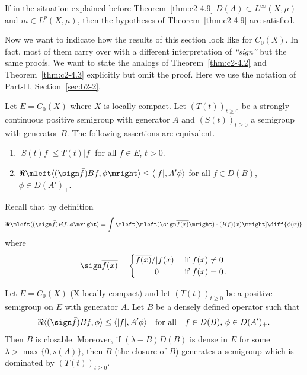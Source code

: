 \begin{example}\label{ex:c2-4.11}
If in the situation explained before Theorem~\ref{thm:c2-4.9}  
$D(A) \subset L^{\infty}(X,\mu)$ and $m \in L^{p}(X,\mu)$, then the hypotheses of Theorem~\ref{thm:c2-4.9}   are satisfied.
\end{example}
Now we want to indicate how the results of this section look like for $C_{0}(X)$.
In fact, most of them carry over with a different interpretation of \emph{``sign''} but the same proofs.
We want to state the analogs of Theorem~\ref{thm:c2-4.2}   and Theorem~\ref{thm:c2-4.3}   explicitly but omit the proof.
Here we use the notation of Part-II, Section~\ref{sec:b2-2}.
\begin{theorem}\label{thm:c2-4.12}
Let $E = C_{0}(X)$ where $X$ is locally compact.
Let $(T(t))_{t \geq 0}$ be a strongly continuous positive semigroup with
generator $A$ and $(S(t))_{t \geq 0}$ a semigroup with generator $B$.
The following assertions are equivalent.
\begin{enumerate}[\upshape (a)]
\item \label{thm:c2-4.12-1}
$|S(t)f| \leq T(t)|f|$ for all $f \in E$, $t > 0$.
\item \label{thm:c2-4.12-2}
$\Re\mleft\langle(\sign  \bar{f})Bf,\phi\mright\rangle \leq \langle|f|,A'\phi\rangle$ for all $f \in D(B)$, $\phi \in D(A')_{+}$.
\end{enumerate}
\end{theorem}
Recall that by definition
\[
\Re\mleft\langle(\sign  \bar{f})Bf,\phi\mright\rangle = \int \mleft[\mleft(\sign \overline{f(x)}\mright)\cdot(Bf)(x)\mright] \diff{\phi(x)}
\]
where 
\[\sign  \overline{f(x)} =
\begin{cases}
    \overline{f(x)}/|f(x)| & \text{if } f(x) \neq 0 \\
    \ \quad\quad0  & \text{if } f(x) = 0\,.
\end{cases}
\]
\begin{theorem}\label{thm:c2-4.13}
Let $E = C_{0}(X)$ (X locally compact) and let $(T(t))_{t \geq 0}$
be a positive semigroup on $E$ with generator $A$.
Let $B$ be a densely defined operator such that
\begin{equation}\label{eq:c2-4.12}
\Re  \langle(\sign  \bar{f})Bf,\phi\rangle \leq \langle|f|,A'\phi\rangle \quad 
\text{for all} \quad f \in D(B),\, \phi \in D(A')_{+}.
\end{equation}
Then $B$ is closable.
Moreover, if\/ $(\lambda - B)D(B)$ is dense in $E$ for some $\lambda > \max\{0,s(A)\}$, then $\overline{B}$ (the closure of\/ $B$) generates a
semigroup which is dominated by $(T(t))_{t \geq 0}$.
\end{theorem}
